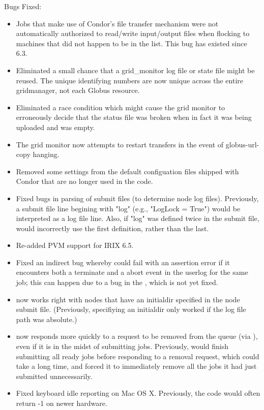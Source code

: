 \noindent Bugs Fixed:

\begin{itemize}

\item Jobs that make use of Condor's file transfer mechanism were not
automatically authorized to read/write input/output files when
flocking to machines that did not happen to be in the
 list.  This bug has existed since 6.3.

\item Eliminated a small chance that a grid\_monitor log file or state file
    might be reused.  The unique identifying numbers are now unique across
	the entire gridmanager, not each Globus resource.

\item Eliminated a race condition which might cause the grid monitor to
	erroneously decide that the status file was broken when in fact it
	was being uploaded and was empty.

\item The grid monitor now attempts to restart transfers in the event of
    globus-url-copy hanging.

\item Removed some settings from the default configuation files
  shipped with Condor that are no longer used in the code.

\item Fixed bugs in  parsing of submit files (to determine
  node log files).  Previously, a submit file line begining with
  "log" (e.g., "LogLock = True") would be interpreted as a log file
  line.  Also, if "log" was defined twice in the submit file,
   would incorrectly use the first definition, rather than
  the last.

\item Re-added PVM support for IRIX 6.5.

\item Fixed an indirect bug whereby  could fail with an
assertion error if it encounters both a terminate and a abort event in
the userlog for the same job; this can happen due to a bug in the
, which is not yet fixed.

\item {} now works right with nodes that have an initialdir
  specified in the node submit file.  (Previously, specifiying
  an initialdir only worked if the log file path was absolute.)

\item {} now responds more quickly to a request to be
      removed from the queue (via ), even if it is in the
      midst of submitting jobs.  Previously,  would
      finish submitting all ready jobs before responding to a removal
      request, which could take a long time, and forced it to
      immediately remove all the jobs it had just submitted
      unnecessarily.

\item Fixed keyboard idle reporting on Mac OS X. Previously, the code
      would often return -1 on newer hardware. 

\end{itemize}


